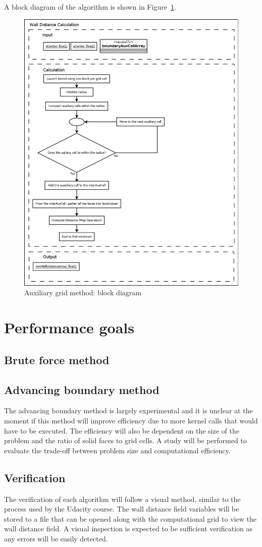 \documentclass[]{aiaa-tc}%
\begin{document}
A block diagram of the algorithm is shown in Figure~\ref{f:ag_block}.

\begin{figure}
  \centering
  \includegraphics[width=0.7\linewidth]{figures/auxiliary_grid/ab_block}
  \caption{Auxiliary grid method: block diagram}
  \label{f:ag_block}
\end{figure}

\section{Performance goals}

\subsection{Brute force method}

\subsection{Advancing boundary method}
The advancing boundary method is largely experimental and it is
unclear at the moment if this method will improve efficiency due to
more kernel calls that would have to be executed. The efficiency will
also be dependent on the size of the problem and the ratio of solid
faces to grid cells. A study will be performed to evaluate the
trade-off between problem size and computational efficiency.

\subsection{Verification}
The verification of each algorithm will follow a visual method,
similar to the process used by the Udacity course. The wall distance
field variables will be stored to a file that can be opened along with
the computational grid to view the wall distance field. A visual
inspection is expected to be sufficient verification as any errors will
be easily detected.
\end{document}
